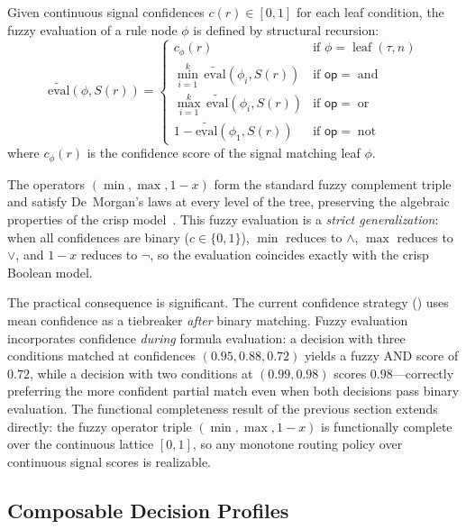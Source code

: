 \begin{definition}
Given continuous signal confidences $c(r) \in [0,1]$ for each leaf condition, the fuzzy evaluation of a rule node $\phi$ is defined by structural recursion:
\begin{equation}
  \widetilde{\text{eval}}(\phi, S(r)) =
  \begin{cases}
    c_\phi(r)
      & \text{if } \phi = \operatorname{leaf}(\tau, n) \\[6pt]
    \displaystyle\min_{i=1}^{k}\, \widetilde{\text{eval}}(\phi_i, S(r))
      & \text{if } \mathsf{op} = \operatorname{and} \\[6pt]
    \displaystyle\max_{i=1}^{k}\, \widetilde{\text{eval}}(\phi_i, S(r))
      & \text{if } \mathsf{op} = \operatorname{or} \\[6pt]
    1 - \widetilde{\text{eval}}(\phi_1, S(r))
      & \text{if } \mathsf{op} = \operatorname{not}
  \end{cases}
\end{equation}
where $c_\phi(r)$ is the confidence score of the signal matching leaf $\phi$.
\end{definition}

The operators $(\min, \max, 1{-}x)$ form the standard fuzzy complement triple and satisfy De~Morgan's laws at every level of the tree, preserving the algebraic properties of the crisp model~\cite{bellman1970decision}.
This fuzzy evaluation is a \emph{strict generalization}: when all confidences are binary ($c \in \{0,1\}$), $\min$ reduces to $\wedge$, $\max$ reduces to $\vee$, and $1{-}x$ reduces to $\neg$, so the evaluation coincides exactly with the crisp Boolean model.

The practical consequence is significant.
The current confidence strategy () uses mean confidence as a tiebreaker \emph{after} binary matching.
Fuzzy evaluation incorporates confidence \emph{during} formula evaluation: a decision with three conditions matched at confidences $(0.95, 0.88, 0.72)$ yields a fuzzy AND score of $0.72$, while a decision with two conditions at $(0.99, 0.98)$ scores $0.98$---correctly preferring the more confident partial match even when both decisions pass binary evaluation.
The functional completeness result of the previous section extends directly: the fuzzy operator triple $(\min, \max, 1{-}x)$ is functionally complete over the continuous lattice $[0,1]$, so any monotone routing policy over continuous signal scores is realizable.

\subsection{Composable Decision Profiles}

